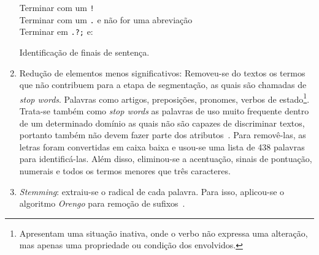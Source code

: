 \begin{enumerate}
\begin{algorithm}
{	Terminar com um \texttt{!}\\
	Terminar com um \texttt{.} e não for uma abreviação\\
	Terminar em \texttt{.?;} e:
	}
	
	\caption{Identificação de finais de sentença.}
	\label{alg:identificacaofinaisdesent}
\end{algorithm}




\item Redução de elementos menos significativos: Removeu-se do textos os termos que não contribuem para a etapa de segmentação, 
	as quais são chamadas de \textit{stop words}. Palavras como artigos, preposições, pronomes, verbos de estado\footnote{Apresentam uma situação inativa, onde o verbo não expressa uma alteração, mas apenas uma propriedade ou condição dos envolvidos.}. Trata-se também como \textit{stop words} as palavras de uso muito frequente dentro de um determinado domínio as quais não são capazes de discriminar textos, portanto também não devem fazer parte dos atributos~\cite{Rezende2003}. Para removê-las, as letras foram convertidas em caixa baixa e usou-se uma lista de 438 palavras para identificá-las. Além disso, eliminou-se a acentuação, sinais de pontuação, numerais e todos os termos menores que três caracteres.

\item \textit{Stemming}: extraiu-se o radical de cada palavra. Para isso, aplicou-se o algoritmo \textit{Orengo} %
	para remoção de sufixos~\cite{Alvares2005}.

\end{enumerate}
	


